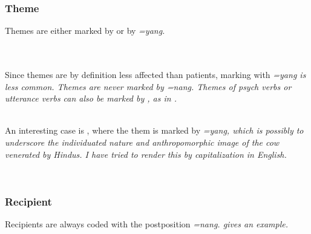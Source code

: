 \subsubsection{Theme}\label{sec:func:Theme}
Themes are either marked by \zero{} or by \em =yang\em.

\\

 \\
Since themes are by definition less affected than patients, marking with \em =yang \em is less common. Themes are never marked by \em =nang\em.
Themes of psych verbs or utterance verbs can also be marked by , as in .

 \\
An interesting case is , where the them is marked by \em =yang\em, which is possibly to underscore the individuated nature and anthropomorphic image of the cow venerated by Hindus. I have tried to render this by capitalization in English.

 \\
\subsubsection{Recipient}\label{sec:func:Recipient}
Recipients are always coded with the postposition \em =nang\em.  gives an example.

